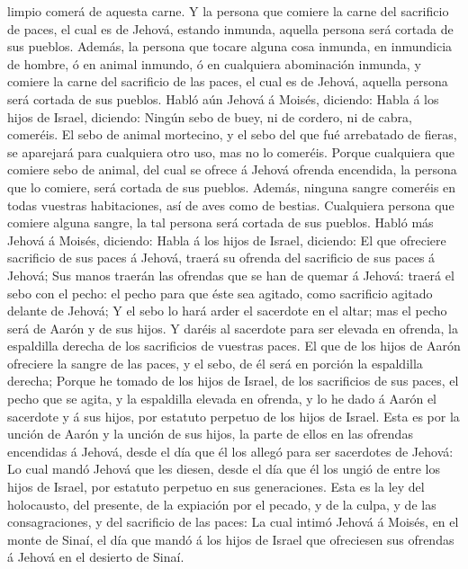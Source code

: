 limpio comerá de aquesta carne.  Y la persona que comiere
la carne del sacrificio de paces, el cual es de Jehová, estando inmunda,
aquella persona será cortada de sus pueblos.  Además, la
persona que tocare alguna cosa inmunda, en inmundicia de hombre, ó en
animal inmundo, ó en cualquiera abominación inmunda, y comiere la carne
del sacrificio de las paces, el cual es de Jehová, aquella persona será
cortada de sus pueblos.  Habló aún Jehová á Moisés,
diciendo:  Habla á los hijos de Israel, diciendo: Ningún
sebo de buey, ni de cordero, ni de cabra, comeréis.  El
sebo de animal mortecino, y el sebo del que fué arrebatado de fieras, se
aparejará para cualquiera otro uso, mas no lo comeréis. 
Porque cualquiera que comiere sebo de animal, del cual se ofrece á
Jehová ofrenda encendida, la persona que lo comiere, será cortada de sus
pueblos.  Además, ninguna sangre comeréis en todas
vuestras habitaciones, así de aves como de bestias. 
Cualquiera persona que comiere alguna sangre, la tal persona será
cortada de sus pueblos.  Habló más Jehová á Moisés,
diciendo:  Habla á los hijos de Israel, diciendo: El que
ofreciere sacrificio de sus paces á Jehová, traerá su ofrenda del
sacrificio de sus paces á Jehová;  Sus manos traerán las
ofrendas que se han de quemar á Jehová: traerá el sebo con el pecho: el
pecho para que éste sea agitado, como sacrificio agitado delante de
Jehová;  Y el sebo lo hará arder el sacerdote en el
altar; mas el pecho será de Aarón y de sus hijos.  Y
daréis al sacerdote para ser elevada en ofrenda, la espaldilla derecha
de los sacrificios de vuestras paces.  El que de los
hijos de Aarón ofreciere la sangre de las paces, y el sebo, de él será
en porción la espaldilla derecha;  Porque he tomado de
los hijos de Israel, de los sacrificios de sus paces, el pecho que se
agita, y la espaldilla elevada en ofrenda, y lo he dado á Aarón el
sacerdote y á sus hijos, por estatuto perpetuo de los hijos de Israel.
 Esta es por la unción de Aarón y la unción de sus hijos,
la parte de ellos en las ofrendas encendidas á Jehová, desde el día que
él los allegó para ser sacerdotes de Jehová:  Lo cual
mandó Jehová que les diesen, desde el día que él los ungió de entre los
hijos de Israel, por estatuto perpetuo en sus generaciones.
 Esta es la ley del holocausto, del presente, de la
expiación por el pecado, y de la culpa, y de las consagraciones, y del
sacrificio de las paces:  La cual intimó Jehová á Moisés,
en el monte de Sinaí, el día que mandó á los hijos de Israel que
ofreciesen sus ofrendas á Jehová en el desierto de Sinaí.


